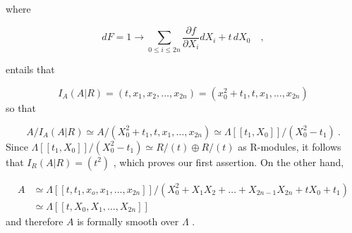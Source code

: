 \begin{center}
\end{center}
where

\begin{equation*}
dF = 1 \to \sum_{0 \leq i \leq 2n} \frac{\partial f}{\partial X_i} dX_i + t\,dX_0 \quad , 
\end{equation*}


 entails that

\begin{equation*}
I_A(A|R) = (t, x_1, x_2, \ldots, x_{2n}) = (x_0^2 + t_1, t, x_1, \ldots, x_{2n})
\end{equation*}
so that

\begin{equation*}
A/I_A(A|R) \simeq A/(X_0^2 + t_1, t, x_1, \ldots, x_{2n}) \simeq \Lambda[[t_1, X_0]]/(X_0^2 - t_1)  \ .
\end{equation*}
Since  $\Lambda[[t_1, X_0]]/(X_0^2 - t_1) \simeq R/(t) \oplus R/(t)$  as R-modules, it follows that $I_R(A|R) = (t^2)$  , which proves our first assertion. On the other hand,

\begin{equation*}
\begin{aligned} A &\simeq \Lambda[[t, t_1, x_o, x_1, \ldots, x_{2n}]]/(X_0^2 + X_1X_2 + \ldots + X_{2n-1}X_{2n} + tX_0 + t_1) \\ &\simeq \Lambda[[t, X_0, X_1,\ldots,X_{2n}]] \end{aligned}
\end{equation*}
and therefore  $A$  is formally smooth over  $\Lambda$  .

